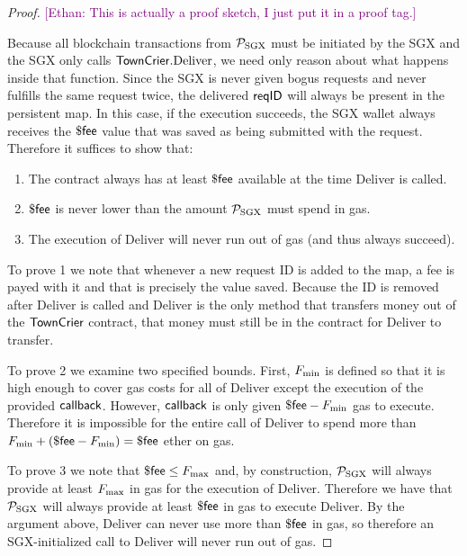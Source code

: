 \documentclass[letterpaper,twocolumn,10pt]{article}
\newcommand{\ethan}[1]{\textcolor{purple}{[\textsf{Ethan: #1}]}}
\begin{document}
\begin{proof}
\ethan{This is actually a proof sketch, I just put it in a proof tag.}

Because all blockchain transactions from $\mathcal{P}_{\rm SGX}$ must be initiated by the SGX and the SGX only calls ${\sf TownCrier}.{\rm Deliver}$,
we need only reason about what happens inside that function.
Since the SGX is never given bogus requests and never fulfills the same request twice,
the delivered ${\sf reqID}$ will always be present in the persistent map.
In this case, if the execution succeeds, the SGX wallet always receives the $\${\sf fee}$ value that was saved as being submitted with the request.
Therefore it suffices to show that:
\begin{enumerate}
  \item The contract always has at least $\${\sf fee}$ available at the time Deliver is called.
  \item $\${\sf fee}$ is never lower than the amount $\mathcal{P}_{\rm SGX}$ must spend in gas.
  \item The execution of Deliver will never run out of gas (and thus always succeed).
\end{enumerate}

To prove 1 we note that whenever a new request ID is added to the map, a fee is payed with it and that is precisely the value saved.
Because the ID is removed after Deliver is called and Deliver is the only method that transfers money out of the ${\sf TownCrier}$ contract,
that money must still be in the contract for Deliver to transfer.

To prove 2 we examine two specified bounds.
First, $F_{\rm min}$ is defined so that it is high enough to cover gas costs for all of Deliver except the execution of the provided ${\sf callback}$.
However, ${\sf callback}$ is only given $\${\sf fee} - F_{\rm min}$ gas to execute.
Therefore it is impossible for the entire call of Deliver to spend more than $F_{\rm min} + (\${\sf fee} - F_{\rm min}) = \${\sf fee}$ ether on gas.

To prove 3 we note that $\${\sf fee} \leq F_{\rm max}$ and, by construction, $\mathcal{P}_{\rm SGX}$ will always provide at least
$F_{\rm max}$ in gas for the execution of Deliver.
Therefore we have that $\mathcal{P}_{\rm SGX}$ will always provide at least $\${\sf fee}$ in gas to execute Deliver.
By the argument above, Deliver can never use more than $\${\sf fee}$ in gas, so therefore an SGX-initialized call to Deliver will never run out of gas.
\end{proof}
\end{document}
